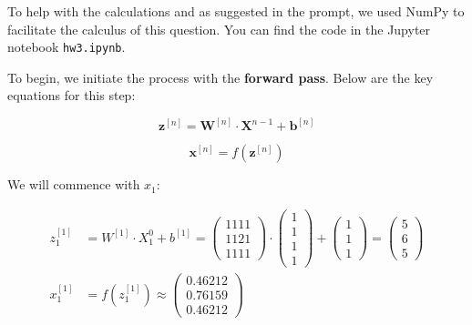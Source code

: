 \documentclass[12pt]{article}
\begin{document}
\begin{enumerate}[leftmargin=\labelsep]
          \vskip 0.3cm

          To help with the calculations and as suggested in the prompt, we used NumPy to facilitate the calculus of this question. You can find the code in the Jupyter notebook \texttt{hw3.ipynb}.
          
          To begin, we initiate the process with the \textbf{forward pass}. Below are the key equations for this step:

            \begin{equation}\label{ex2-z}
                \mathbf{z}^{[n]} = \mathbf{W}^{[n]} \cdot \mathbf{X}^{{n-1}} + \mathbf{b}^{[n]} 
            \end{equation}

            \begin{equation}\label{ex2-x}
                \mathbf{x}^{[n]} = f(\mathbf{z}^{[n]})
            \end{equation}

          We will commence with $x_1$:

            \begin{align*}
                z^{[1]}_1 &= {W}^{[1]} \cdot {X}^{0}_1 + {b}^{[1]} = \begin{pmatrix} 1 1 1 1 \\ 1 1 2 1 \\ 1 1 1 1\end{pmatrix} \cdot  \begin{pmatrix} 1 \\ 1 \\ 1 \\ 1 \end{pmatrix} +
                 \begin{pmatrix} 1 \\ 1 \\ 1\end{pmatrix} = \begin{pmatrix} 5 \\ 6 \\ 5\end{pmatrix} \\
                {x}^{[1]}_1 &= f({z}^{[1]}_1) \approx \begin{pmatrix} 0.46212 \\ 0.76159 \\ 0.46212\end{pmatrix} \\
            \end{align*}


\end{enumerate}
\end{document}
